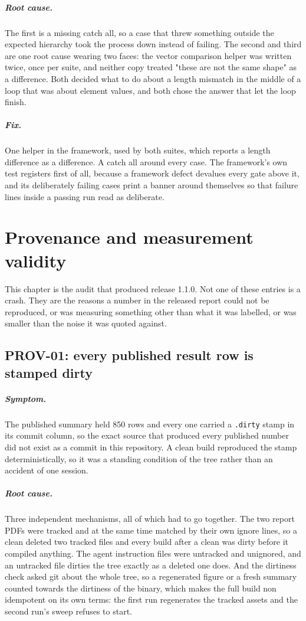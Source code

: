 \documentclass[11pt,a4paper]{report}
\newcommand{\symptom}[1]{\paragraph{Symptom.}#1}
\newcommand{\rootcause}[1]{\paragraph{Root cause.}#1}
\newcommand{\fix}[1]{\paragraph{Fix.}#1}
\begin{document}
\rootcause{The first is a missing catch all, so a case that threw something
outside the expected hierarchy took the process down instead of failing. The
second and third are one root cause wearing two faces: the vector comparison
helper was written twice, once per suite, and neither copy treated "these are not
the same shape" as a difference. Both decided what to do about a length mismatch
in the middle of a loop that was about element values, and both chose the answer
that let the loop finish.}

\fix{One helper in the framework, used by both suites, which reports a length
difference as a difference. A catch all around every case. The framework's own
test registers first of all, because a framework defect devalues every gate above
it, and its deliberately failing cases print a banner around themselves so that
failure lines inside a passing run read as deliberate.}

\chapter{Provenance and measurement validity}

This chapter is the audit that produced release 1.1.0. Not one of these entries
is a crash. They are the reasons a number in the released report could not be
reproduced, or was measuring something other than what it was labelled, or was
smaller than the noise it was quoted against.

\section{PROV-01: every published result row is stamped dirty}

\symptom{The published summary held 850 rows and every one carried a
\texttt{.dirty} stamp in its commit column, so the exact source that produced
every published number did not exist as a commit in this repository. A clean
build reproduced the stamp deterministically, so it was a standing condition of
the tree rather than an accident of one session.}

\rootcause{Three independent mechanisms, all of which had to go together. The two
report PDFs were tracked and at the same time matched by their own ignore lines,
so a clean deleted two tracked files and every build after a clean was dirty
before it compiled anything. The agent instruction files were untracked and
unignored, and an untracked file dirties the tree exactly as a deleted one does.
And the dirtiness check asked git about the whole tree, so a regenerated figure
or a fresh summary counted towards the dirtiness of the binary, which makes the
full build non idempotent on its own terms: the first run regenerates the tracked
assets and the second run's sweep refuses to start.}
\end{document}
